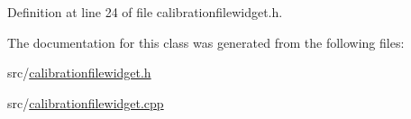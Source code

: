 Definition at line 24 of file calibrationfilewidget.\+h.



The documentation for this class was generated from the following files\+:\begin{DoxyCompactItemize}
\item 
src/\mbox{\hyperlink{calibrationfilewidget_8h}{calibrationfilewidget.\+h}}\item 
src/\mbox{\hyperlink{calibrationfilewidget_8cpp}{calibrationfilewidget.\+cpp}}\end{DoxyCompactItemize}

